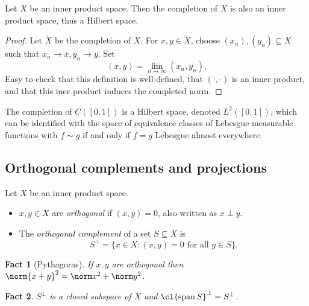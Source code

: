\documentclass[a4paper]{article}
\newtheorem*{fact}{Fact}
\DeclareMathOperator{\spans}{span} %
\begin{document}
\begin{proposition}
  Let \(X\) be an inner product space. Then the completion of \(X\) is also an inner product space, thus a Hilbert space.
\end{proposition}

\begin{proof}
  Let \(\tilde X\) be the completion of \(X\). For \(x, y \in \tilde X\), choose \((x_n), (y_n) \subseteq X\) such that \(x_n \to x, y_n \to y\). Set
  \[
    (x, y) = \lim_{n \to \infty} (x_n, y_n).
  \]
  Easy to check that this definition is well-defined, that \((\cdot, \cdot)\) is an inner product, and that this iner product induces the completed norm.
\end{proof}

\begin{eg}
  The completion of \(C([0, 1])\) is a Hilbert space, denoted \(L^2([0, 1])\), which can be identified with the space of equivalence classes of Lebesgue measurable functions with \(f \sim g\) if and only if \(f = g\) Lebesgue almost everywhere.
\end{eg}

\subsection{Orthogonal complements and projections}

\begin{definition}
  Let \(X\) be an inner product space.
  \begin{itemize}
  \item \(x, y \in X\) are \emph{orthogonal} if \((x, y) = 0\), also written as \(x \perp y\).
  \item The \emph{orthogonal complement} of a set \(S \subseteq X\) is
    \[
      S^\perp = \{x \in X: (x, y) = 0 \text{ for all } y \in S\}.
    \]
  \end{itemize}
\end{definition}

\begin{fact}[Pythagoras]
  If \(x, y\) are orthogonal then \(\norm{x + y}^2 = \norm x^2 + \norm y^2\).
\end{fact}

\begin{fact}
  \(S^\perp\) is a closed subspace of \(X\) and \(\cl{\spans S}^\perp = S^\perp\).
\end{fact}
\end{document}
